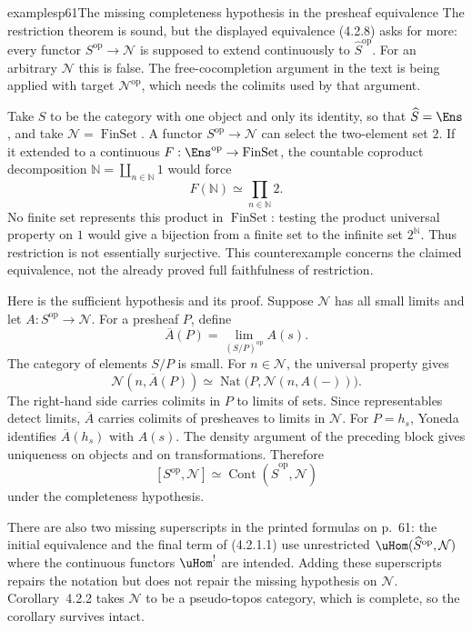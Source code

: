 \begin{dcomment}{examples}{p61}{The missing completeness hypothesis in the presheaf equivalence}
The restriction theorem is sound, but the displayed equivalence (4.2.8) asks for more: every functor $S^{\mathrm{op}}\to\mathcal N$ is supposed to extend continuously to $\widehat S^{\mathrm{op}}$. For an arbitrary $\mathcal N$ this is false. The free-cocompletion argument in the text is being applied with target $\mathcal N^{\mathrm{op}}$, which needs the colimits used by that argument.

Take $S$ to be the category with one object and only its identity, so that $\widehat S=\Ens$, and take $\mathcal N=\operatorname{FinSet}$. A functor $S^{\mathrm{op}}\to\mathcal N$ can select the two-element set $2$. If it extended to a continuous $F:\Ens^{\mathrm{op}}\to\operatorname{FinSet}$, the countable coproduct decomposition $\mathbb N=\coprod_{n\in\mathbb N}1$ would force
\[
 F(\mathbb N)\simeq\prod_{n\in\mathbb N}2.
\]
No finite set represents this product in $\operatorname{FinSet}$: testing the product universal property on $1$ would give a bijection from a finite set to the infinite set $2^{\mathbb N}$. Thus restriction is not essentially surjective. This counterexample concerns the claimed equivalence, not the already proved full faithfulness of restriction.

Here is the sufficient hypothesis and its proof. Suppose $\mathcal N$ has all small limits and let $A:S^{\mathrm{op}}\to\mathcal N$. For a presheaf $P$, define
\[
 \overline A(P)=\lim_{(S/P)^{\mathrm{op}}}A(s).
\]
The category of elements $S/P$ is small. For $n\in\mathcal N$, the universal property gives
\[
 \mathcal N(n,\overline A(P))
 \simeq\operatorname{Nat}\bigl(P,\mathcal N(n,A(-))\bigr).
\]
The right-hand side carries colimits in $P$ to limits of sets. Since representables detect limits, $\overline A$ carries colimits of presheaves to limits in $\mathcal N$. For $P=h_s$, Yoneda identifies $\overline A(h_s)$ with $A(s)$. The density argument of the preceding block gives uniqueness on objects and on transformations. Therefore
\[
 [S^{\mathrm{op}},\mathcal N]\simeq
 \operatorname{Cont}(\widehat S^{\mathrm{op}},\mathcal N)
\]
under the completeness hypothesis.

There are also two missing superscripts in the printed formulas on p.~61: the initial equivalence and the final term of (4.2.1.1) use unrestricted $\uHom(\widehat S^{\mathrm{op}},\mathcal N)$ where the continuous functors $\uHom^{!}$ are intended. Adding these superscripts repairs the notation but does not repair the missing hypothesis on $\mathcal N$. Corollary~4.2.2 takes $\mathcal N$ to be a pseudo-topos category, which is complete, so the corollary survives intact.
\end{dcomment}

